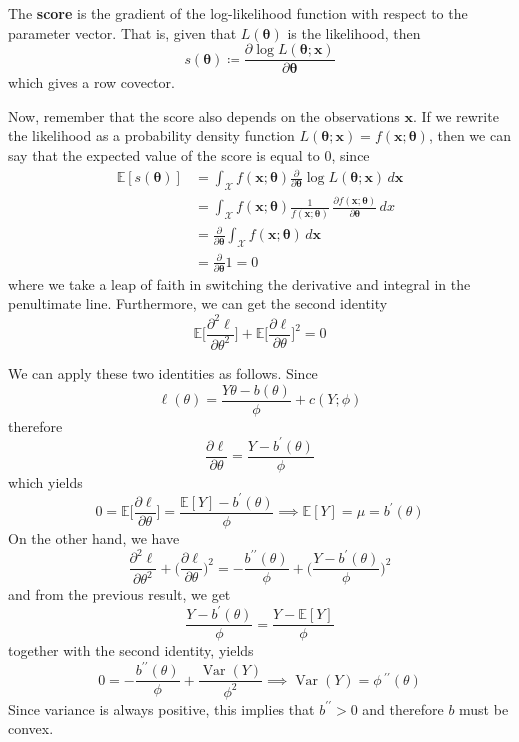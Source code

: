 \documentclass{article}
\DeclareMathOperator{\Var}{Var}
\begin{document}
        \begin{definition}[Score]
        The \textbf{score} is the gradient of the log-likelihood function with respect to the parameter vector. That is, given that $L(\boldsymbol{\theta})$ is the likelihood, then 
        \[s(\boldsymbol{\theta}) \coloneqq \frac{\partial \log L(\boldsymbol{\theta}; \mathbf{x})}{\partial \boldsymbol{\theta}}\]
        which gives a row covector. 
        \end{definition}

        Now, remember that the score also depends on the observations $\mathbf{x}$. If we rewrite the likelihood as a probability density function $L(\boldsymbol{\theta}; \mathbf{x}) = f(\mathbf{x}; \boldsymbol{\theta})$, then we can say that the expected value of the score is equal to $0$, since 
        \begin{align*}
         \mathbb{E}[s(\boldsymbol{\theta})] & = \int_\mathcal{X} f(\mathbf{x}; \boldsymbol{\theta}) \frac{\partial}{\partial \boldsymbol{\theta}} \log L (\boldsymbol{\theta}; \mathbf{x}) \,d\mathbf{x} \\
         & = \int_\mathcal{X} f(\mathbf{x}; \boldsymbol{\theta}) \frac{1}{f(\mathbf{x}; \boldsymbol{\theta})} \, \frac{\partial f(\mathbf{x}; \boldsymbol{\theta})}{\partial \boldsymbol{\theta}} \,dx \\
         & = \frac{\partial}{\partial \boldsymbol{\theta}} \int_\mathcal{X} f(\mathbf{x}; \boldsymbol{\theta}) \,d \mathbf{x} \\
         & = \frac{\partial}{\partial \boldsymbol{\theta}} 1 = 0
        \end{align*}
        where we take a leap of faith in switching the derivative and integral in the penultimate line. Furthermore, we can get the second identity 
        \[\mathbb{E}\bigg[ \frac{\partial^2 \ell}{\partial \theta^2} \bigg] + \mathbb{E} \bigg[ \frac{\partial \ell}{\partial \theta} \bigg]^2 = 0\]

        We can apply these two identities as follows. Since 
        \[\ell (\theta) = \frac{Y \theta - b(\theta)}{\phi} + c(Y ; \phi)\]
        therefore 
        \[\frac{\partial \ell}{\partial \theta} = \frac{Y - b^\prime(\theta)}{\phi}\]
        which yields 
        \[0 = \mathbb{E} \bigg[ \frac{\partial \ell}{\partial \theta} \bigg] = \frac{\mathbb{E}[Y] - b^\prime(\theta)}{\phi} \implies \mathbb{E}[Y] = \mu = b^\prime(\theta)\]
        On the other hand, we have 
        \[\frac{\partial^2 \ell}{\partial \theta^2} + \bigg( \frac{\partial \ell}{\partial \theta} \bigg)^2 = -\frac{b^{\prime\prime} (\theta)}{\phi} + \bigg(\frac{Y - b^\prime (\theta)}{\phi} \bigg)^2\]
        and from the previous result, we get 
        \[\frac{Y - b^\prime(\theta)}{\phi} = \frac{Y - \mathbb{E}[Y]}{\phi}\]
        together with the second identity, yields 
        \[0 = -\frac{b^{\prime\prime}(\theta)}{\phi} + \frac{\Var(Y)}{\phi^2} \implies \Var(Y) = \phi \, ^{\prime\prime} (\theta)\]
        Since variance is always positive, this implies that $b^{\prime\prime} > 0$ and therefore $b$ must be convex. 
\end{document}
